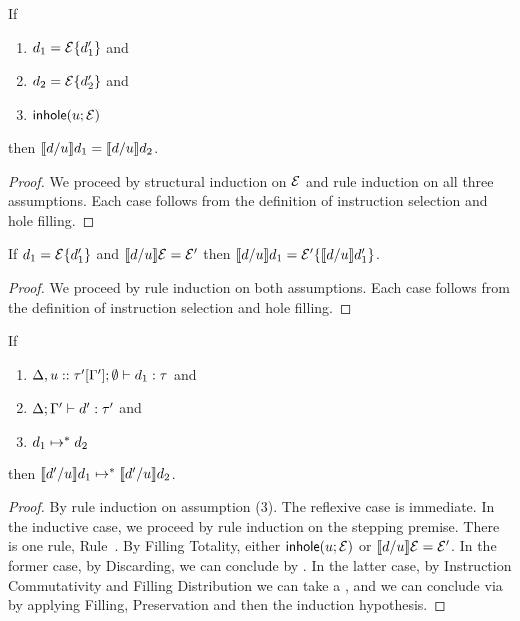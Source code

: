 \begin{lem}[Discarding] If
	\begin{enumerate}[nolistsep]
	\item $d_1=\mathcal{E}\{d_1'\}$ and
	\item $d_2=\mathcal{E}\{d_2'\}$ and
	\item $\mathsf{inhole}(u; \mathcal{E})$
	\end{enumerate}

	then $\llbracket d / u\rrbracket d_1 = \llbracket d / u\rrbracket d_2$.
\end{lem}
\begin{proof} We proceed by structural induction on $\mathcal{E}$ and rule induction on all three assumptions. Each case follows from the definition of instruction selection and hole filling. \end{proof}


\begin{lem} If
	$d_1=\mathcal{E}\{d_1'\}$ and $\llbracket d / u\rrbracket \mathcal{E}=\mathcal{E}'$ then $\llbracket d / u\rrbracket d_1=\mathcal{E}'\{\llbracket d / u\rrbracket d_1'\}$.
\end{lem}
\begin{proof} We proceed by rule induction on both assumptions. Each case follows from the definition of instruction selection and hole filling. \end{proof}


\begin{thm}[Commutativity]
  If
  \begin{enumerate}[nolistsep]
  \item $\Delta, u :: \tau'[\Gamma']; \emptyset \vdash d_1 : \tau$ and
  \item $\Delta; \Gamma' \vdash d' : \tau'$ and
  \item $d_1 \mapsto^* d_2$
\end{enumerate}

  then $\llbracket d' / u\rrbracket d_1 \mapsto^* \llbracket d' / u\rrbracket d_2$.
\end{thm}
\begin{proof}
By rule induction on assumption (3). The reflexive case is immediate. In the inductive case, we proceed by rule induction on the stepping premise. There is one rule, Rule~. By Filling Totality, either $\mathsf{inhole}(u; \mathcal{E})$ or $\llbracket d / u\rrbracket \mathcal{E} = \mathcal{E}'$. In the former case, by Discarding, we can conclude by . In the latter case, by Instruction Commutativity and Filling Distribution we can take a , and we can conclude via  by applying Filling, Preservation and then the induction hypothesis.
\end{proof}

